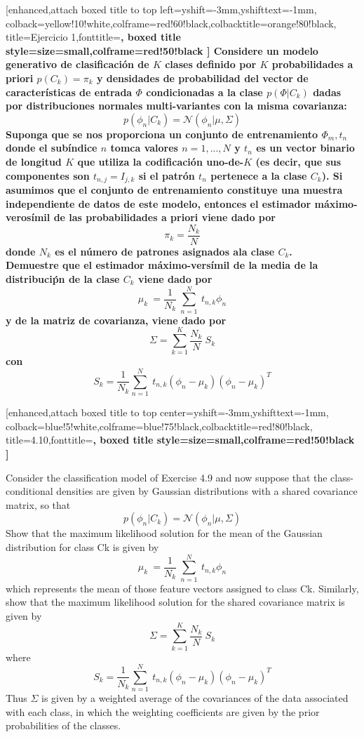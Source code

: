 \documentclass{article}
\begin{document}
\begin {tcolorbox}
	[enhanced,attach boxed title to top left={yshift=-3mm,yshifttext=-1mm}, colback=yellow!10!white,colframe=red!60!black,colbacktitle=orange!80!black, title=Ejercicio 1,fonttitle=\bfseries, boxed title style={size=small,colframe=red!50!black} ]
	Considere un modelo generativo de clasificaci\' on de $K$ clases definido por $K$ probabilidades a priori $p\left(C_k\right)=\pi_k $ y densidades de probabilidad del vector de caracter\' isticas de entrada $\Phi$ condicionadas a la clase $p\left(\Phi|C_k\right) $ dadas por distribuciones normales multi-variantes con la misma covarianza:
	$$ p\left(\phi_n|C_k\right)=\mathcal{N}\left(\phi_n|\mu,\Sigma\right) $$
	Suponga que se nos proporciona un conjunto de entrenamiento $\Phi_m , t_n$ donde el sub\' indice $n$ tomca valores $n=1,...,N$ y $t_n$ es un vector binario de longitud $K$ que utiliza la codificaci\' on  uno-de-$K$ (es decir, que sus componentes son $t_{n,j}=I_{j,k}$ si el patr\' on $t_n$ pertenece a la clase $C_k$). Si asumimos que el conjunto de entrenamiento constituye una muestra independiente de datos de este modelo, entonces el estimador m\' aximo-veros\' imil de las probabilidades a priori viene dado por
	$$\pi_k = \frac{N_k}{N}$$
	donde $N_k$ es el n\' umero de patrones asignados ala clase $C_k$. \\ Demuestre que el estimador m\' aximo-vers\' imil de la media de la distribuci\' pn de la clase $C_k$ viene dado por
	$$ \mu_k\ =\frac{1}{N_k}\ \sum_{n=1}^{N}{\ t_{n,k}\phi_n} $$
	y de la matriz de covarianza, viene dado por
	$$ \Sigma=\sum_{k=1}^{K}{\frac{N_k}{N}\ S_k} $$
	con
	$$ S_k=\frac{1}{N_k}\sum_{n=1}^{N}{\ t_{n,k}\left(\phi_n-\mu_k\right)\left(\phi_n-\mu_k\right)^T} $$
	\begin {tcolorbox}
    [enhanced,attach boxed title to top center={yshift=-3mm,yshifttext=-1mm}, colback=blue!5!white,colframe=blue!75!black,colbacktitle=red!80!black, title=4.10,fonttitle=\bfseries, boxed title style={size=small,colframe=red!50!black} ]
  
Consider the classification model of Exercise 4.9 and now suppose that the class-conditional densities are given by Gaussian distributions with a shared covariance matrix, so that 
        $$ p\left(\phi_n|C_k\right)=\mathcal{N}\left(\phi_n|\mu,\Sigma\right) $$
Show that the maximum likelihood solution for the mean of the Gaussian distribution for class Ck is given by
        $$ \mu_k\ =\frac{1}{N_k}\ \sum_{n=1}^{N}{\ t_{n,k}\phi_n} $$
which represents the mean of those feature vectors assigned to class Ck. Similarly, show that the maximum likelihood solution for the shared covariance matrix is given by
        $$ \Sigma=\sum_{k=1}^{K}{\frac{N_k}{N}\ S_k} $$
where
        $$ S_k=\frac{1}{N_k}\sum_{n=1}^{N}{\ t_{n,k}\left(\phi_n-\mu_k\right)\left(\phi_n-\mu_k\right)^T} $$
Thus $\Sigma$ is given by a weighted average of the covariances of the data associated with each class, in which the weighting coefficients are given by the prior probabilities of the classes.
	\end{tcolorbox}
\end{tcolorbox}
\end{document}
